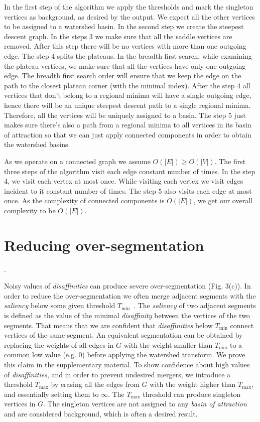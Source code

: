\documentclass{article}\usepackage{times}
\begin{document}
In the first step of the algorithm we apply the thresholds and mark
the singleton vertices as background, as desired by the output. We
expect all the other vertices to be assigned to a watershed basin. In
the second step we create the steepest descent graph. In the steps 3
we make sure that all the saddle vertices are removed. After this step
there will be no vertices with more than one outgoing edge. The step 4
splits the plateaus. In the breadth first search, while examining the
plateau vertices, we make sure that all the vertices have only one
outgoing edge. The breadth first search order will ensure that we keep
the edge on the path to the closest plateau corner (with the minimal
index). After the step 4 all vertices that don't belong to a regional
minima will have a single outgoing edge, hence there will be an unique
steepest descent path to a single regional minima. Therefore, all the
vertices will be uniquely assigned to a basin. The step 5 just makes
sure there's also a path from a regional minima to all vertices in its
basin of attraction so that we can just apply connected components in
order to obtain the watershed basins.

As we operate on a connected graph we assume $O(|E|) \ge O(|V|)$. The
first three steps of the algorithm visit each edge constant number of
times. In the step 4, we visit each vertex at most once. While
visiting each vertex we visit edges incident to it constant number of
times. The step 5 also visits each edge at most once. As the
complexity of connected components is $O(|E|)$, we get our overall
complexity to be $O(|E|)$.

\section{Reducing over-segmentation}.

 Noisy values of \emph{disaffinities} can produce severe
 over-segmentation (Fig. 3(c)). In order to reduce the
 over-segmentation we often merge adjacent segments with the
 \emph{saliency} below some given threshold
 $T_{\min}$~\cite{Najman1996}. The \emph{saliency} of two adjacent
 segments is defined as the value of the minimal \emph{disaffinity}
 between the vertices of the two segments. That means that we are
 confident that \emph{disaffinities} below $T_{\min}$ connect vertices
 of the same segment. An equivalent segmentation can be obtained by
 replacing the weights of all edges in $G$ with the weight smaller
 than $T_{\min}$ to a common low value (e.g. $0$) before applying the
 watershed transform. We prove this claim in the supplementary
 material. To show confidence about high values of
 \emph{disaffinities}, and in order to prevent undesired mergers, we
 introduce a threshold $T_{\max}$ by erasing all the edges from $G$
 with the weight higher than $T_{\max}$, and essentially setting them
 to $\infty$. The $T_{\max}$ threshold can produce singleton vertices
 in $G$. The singleton vertices are not assigned to any \emph{basin of
   attraction} and are considered background, which is often a desired
 result.
\end{document}
